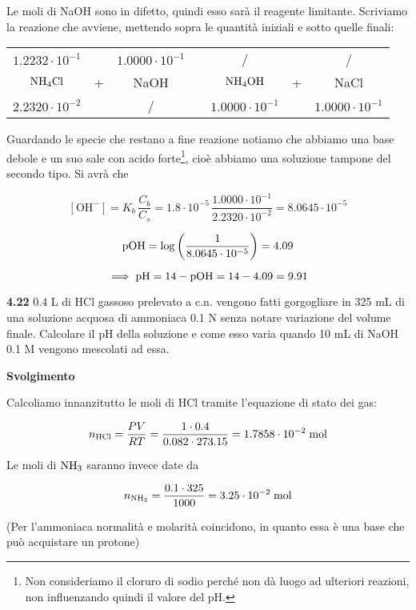 Le moli di NaOH sono in difetto, quindi esso sarà il reagente limitante. Scriviamo la reazione che avviene, mettendo sopra le quantità iniziali e sotto quelle finali:

\begin{center}
    \begin{tabular}{ccccccc}
        $1.2232 \cdot 10^{-1}$ &  & $1.0000 \cdot 10^{-1}$ & & / & & /\\
        $\rm NH_4Cl$ & + & NaOH & \ce{->} & $\rm NH_4OH$ & + & NaCl\\
        $2.2320 \cdot 10^{-2}$ &  & / & & $1.0000 \cdot 10^{-1}$ & &$1.0000 \cdot 10^{-1}$\\
    \end{tabular}
\end{center}

Guardando le specie che restano a fine reazione notiamo che abbiamo una base debole e un suo sale con acido forte\footnote{Non consideriamo il cloruro di sodio perché non dà luogo ad ulteriori reazioni, non influenzando quindi il valore del pH.}, cioè abbiamo una soluzione tampone del secondo tipo. Si avrà che

$$[\text{OH}^-]=K_b\,\frac{C_b}{C_s}
=1.8 \cdot 10^{-5}\,\frac{1.0000 \cdot 10^{-1}}{2.2320 \cdot 10^{-2}}
=8.0645 \cdot 10^{-5}$$

$$\rm pOH=\log \left( \frac{1}{8.0645 \cdot 10^{-5}} \right)=4.09$$

$$\implies \rm pH=14-pOH=14-4.09=9.91$$

\newpage

\textbf{4.22} 0.4 L di HCl gassoso prelevato a c.n. vengono fatti gorgogliare in 325 mL di una soluzione acquosa di ammoniaca 0.1 N senza notare variazione del volume finale. Calcolare il pH della soluzione e come esso varia quando 10 mL di NaOH 0.1 M vengono mescolati ad essa.

\vspace{0.2cm}\large\textbf{Svolgimento}\normalsize

\vspace{0.2cm} Calcoliamo innanzitutto le moli di HCl tramite l'equazione di stato dei gas:

$$n_{\text{HCl}}
=\frac{PV}{RT}
=\frac{1 \cdot 0.4}{0.082 \cdot 273.15}
=1.7858 \cdot 10^{-2} \; \rm mol$$

Le moli di $\rm NH_3$ saranno invece date da

$$n_{\text{NH}_3}
=\frac{0.1 \cdot 325}{1000}
=3.25 \cdot 10^{-2} \; \rm mol$$

(Per l'ammoniaca normalità e molarità coincidono, in quanto essa è una base che può acquistare un protone)

